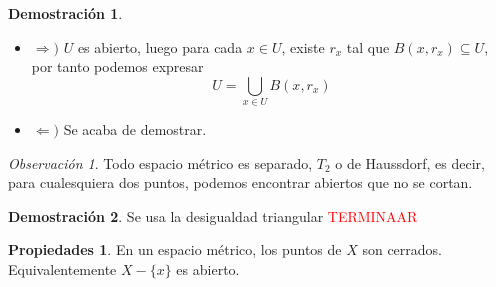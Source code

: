 \documentclass[12pt,twoside]{report}
\theoremstyle{azul}
\theoremstyle{azul2}
\theoremstyle{plain}
\theoremstyle{definition}
\newtheorem*{propi}{Propiedades}
\newtheorem*{dem}{Demostración}
\theoremstyle{remark}
\newtheorem*{obs}{Observación}
\begin{document}
\begin{dem}\:\vspace{-5mm}
\begin{itemize} 

\item $\Rightarrow)$ $U$ es abierto, luego para cada $x \in U$, existe $r_x$ tal que $B(x,r_x) \subseteq U$, por tanto podemos expresar $$U = \underset{x \in U}{\bigcup} B(x,r_x)$$

\item$\Leftarrow)$ Se acaba de demostrar.
\end{itemize}
\end{dem}
\begin{obs}
Todo espacio métrico es separado, $T_2$ o de Haussdorf, es decir, para cualesquiera dos puntos, podemos encontrar abiertos que no se cortan.
\end{obs}
\begin{dem}
Se usa la desigualdad triangular \textcolor{red}{TERMINAAR}
\end{dem}
\begin{propi}
En un espacio métrico, los puntos de $X$ son cerrados. Equivalentemente $X-\{x\}$ es abierto.
\end{propi}
\end{document}

